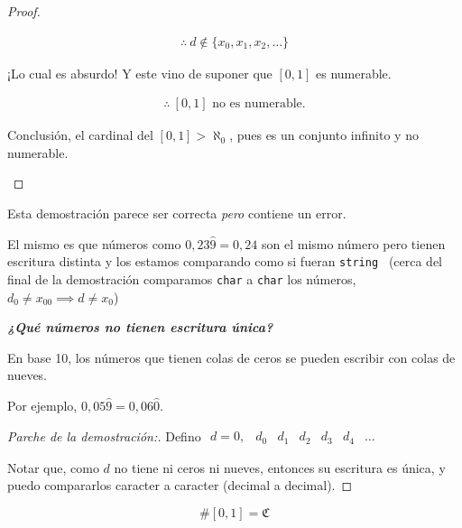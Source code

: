 \begin{proof}
\begin{enumerate}
            \begin{gather*}
                \therefore ~ d \notin \{ x_0, x_1, x_2, \dots \}
            \end{gather*}
            \smallskip

            ¡Lo cual es absurdo! Y este vino de suponer que $[0,1]$ es
            numerable.

            \begin{gather*}
                \therefore ~ [0,1] \text{ no es numerable.}
            \end{gather*}
            \smallskip

            Conclusión, el cardinal del $[0,1] > \aleph_0$, pues es un
            conjunto infinito y no numerable.
    \end{enumerate}
\end{proof}

Esta demostración parece ser correcta \textit{pero} contiene un error.

%
El mismo es que números como $0,23\widehat{9} = 0,24$ son el mismo número 
pero tienen escritura distinta y los estamos comparando como si fueran 
\Verb+string + (cerca del final de la demostración comparamos \Verb+char+ a 
\Verb+char+ los números, $d_0 \neq x_{00} \implies d \neq x_0$)

\medskip
\textit{\textbf{¿Qué números no tienen escritura única?}}

En base 10, los números que tienen colas de ceros se pueden escribir con colas
de nueves.

Por ejemplo, $0,05\widehat{9} = 0,06\widehat{0}$.

\begin{proof}[Parche de la demostración:] \phantom{.}

    Defino $\begin{matrix} 
        d = 0, & d_0 & d_1 & d_2 & d_3 & d_4 & \dots 
    \end{matrix}$ 

    Notar que, como $d$ no tiene ni ceros ni nueves, entonces su escritura es
    única, y puedo compararlos caracter a caracter (decimal a decimal).

\end{proof}

\begin{definicion}{}{}
    \[ \# [0,1] = \mathfrak{C} \]
\end{definicion}

